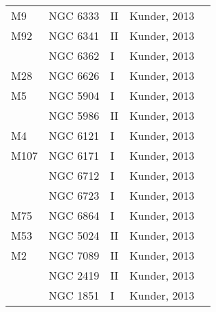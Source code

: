 \documentclass[]{article}
\begin{document}
\begin{longtable}{
	p{1.5cm}|
	p{2.5cm}|
	p{2.5cm}|
	p{3.7cm}|
	p{5.5cm}
	@{}}
		M9             & NGC 6333     & II         & Kunder, 2013         &                                                                        \\
		M92            & NGC 6341     & II         & Kunder, 2013         &                                                                        \\
		& NGC 6362     & I          & Kunder, 2013         &                                                                        \\
		M28            & NGC 6626     & I          & Kunder, 2013         &                                                                        \\
		M5             & NGC 5904     & I          & Kunder, 2013         &                                                                        \\
		& NGC 5986     & II         & Kunder, 2013         &                                                                        \\
		M4             & NGC 6121     & I          & Kunder, 2013         &                                                                        \\
		M107           & NGC 6171     & I          & Kunder, 2013         &                                                                        \\
		& NGC 6712     & I          & Kunder, 2013         &                                                                        \\
		& NGC 6723     & I          & Kunder, 2013         &                                                                        \\
		M75            & NGC 6864     & I          & Kunder, 2013         &                                                                        \\
		M53            & NGC 5024     & II         & Kunder, 2013         &                                                                        \\
		M2             & NGC 7089     & II         & Kunder, 2013         &                                                                        \\
		& NGC 2419     & II         & Kunder, 2013         &                                                                        \\
		& NGC 1851     & I          & Kunder, 2013         &                                                                        \\

\end{longtable}
\end{document}
